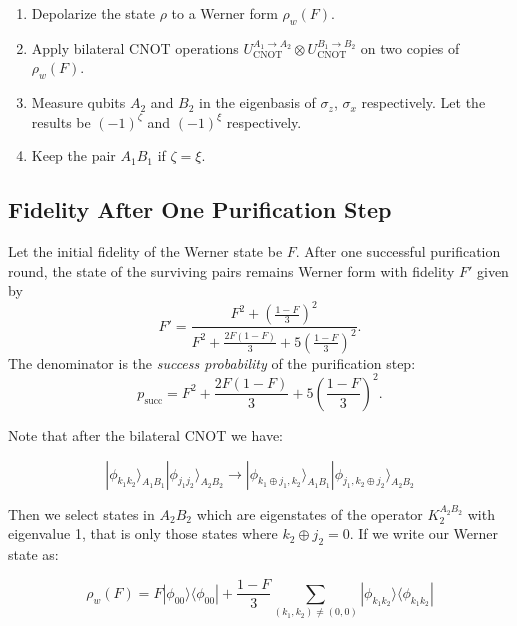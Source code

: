 \documentclass[conference]{IEEEtran}
\begin{document}
\begin{enumerate}
    \item Depolarize the state $\rho$ to a Werner form $\rho_w(F)$.
    \item Apply bilateral CNOT operations $U_{\text{CNOT}}^{A_1 \rightarrow A_2} \otimes U_{\text{CNOT}}^{B_1 \rightarrow B_2}$ on two copies of $\rho_w(F)$.
    \item Measure qubits $A_2$ and $B_2$ in the eigenbasis of $\sigma_z$, $\sigma_x$ respectively. Let the results be $(-1)^{\zeta}$ and $(-1)^{\xi}$ respectively.
    \item Keep the pair $A_1 B_1$ if $\zeta = \xi$.
\end{enumerate}

\subsection{Fidelity After One Purification Step}

Let the initial fidelity of the Werner state be $F$.
After one successful purification round, the state of the surviving pairs
remains Werner form with fidelity $F'$ given by
\begin{equation}
F' = \frac{F^2 + \left(\frac{1-F}{3}\right)^2}
{F^2 + \frac{2F(1-F)}{3} + 5\left(\frac{1-F}{3}\right)^2}.
\label{eq:BBPSSW_map}
\end{equation}
The denominator is the \emph{success probability} of the purification step:
\begin{equation}
p_{\text{succ}} = F^2 + \frac{2F(1-F)}{3} + 5\left(\frac{1-F}{3}\right)^2.
\end{equation}

Note that after the bilateral CNOT we have:

\begin{equation}
    |\phi_{k_1 k_2}\rangle_{A_1 B_1} |\phi_{j_1 j_2}\rangle_{A_2 B_2} \rightarrow |\phi_{k_1 \oplus j_1, k_2}\rangle_{A_1 B_1} |\phi_{j_1, k_2 \oplus j_2}\rangle_{A_2 B_2}
\end{equation}

Then we select states in $A_2B_2$ which are eigenstates of the operator $K_2^{A_2 B_2}$ with eigenvalue 1, that is only those states where $k_2 \oplus j_2 = 0$. If we write our Werner state as:

\begin{equation}
    \rho_w(F) = F | \phi_{00} \rangle \langle \phi_{00} | + \frac{1-F}{3} \sum_{(k_1, k_2) \neq (0,0)} | \phi_{k_1 k_2} \rangle \langle \phi_{k_1 k_2} |
\end{equation}
\end{document}
